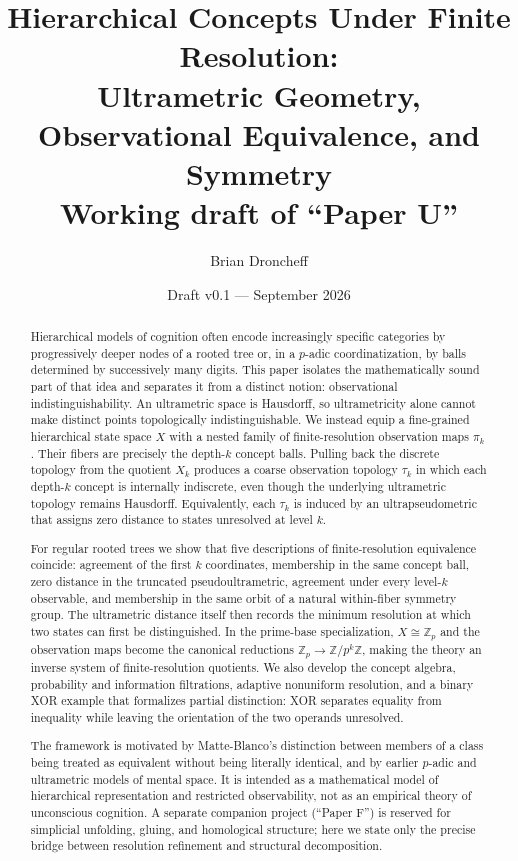 \documentclass[11pt]{article}
\title{Hierarchical Concepts Under Finite Resolution:\\
Ultrametric Geometry, Observational Equivalence, and Symmetry\\
\large Working draft of ``Paper U''}
\author{Brian Droncheff}
\date{Draft v0.1 --- September 2026}
\theoremstyle{definition}
\theoremstyle{remark}
\begin{document}
\maketitle

\begin{abstract}
Hierarchical models of cognition often encode increasingly specific categories by progressively deeper nodes of a rooted tree or, in a $p$-adic coordinatization, by balls determined by successively many digits.  This paper isolates the mathematically sound part of that idea and separates it from a distinct notion: observational indistinguishability.  An ultrametric space is Hausdorff, so ultrametricity alone cannot make distinct points topologically indistinguishable.  We instead equip a fine-grained hierarchical state space $X$ with a nested family of finite-resolution observation maps $\pi_k$.  Their fibers are precisely the depth-$k$ concept balls.  Pulling back the discrete topology from the quotient $X_k$ produces a coarse observation topology $\tau_k$ in which each depth-$k$ concept is internally indiscrete, even though the underlying ultrametric topology remains Hausdorff.  Equivalently, each $\tau_k$ is induced by an ultrapseudometric that assigns zero distance to states unresolved at level $k$.

For regular rooted trees we show that five descriptions of finite-resolution equivalence coincide: agreement of the first $k$ coordinates, membership in the same concept ball, zero distance in the truncated pseudoultrametric, agreement under every level-$k$ observable, and membership in the same orbit of a natural within-fiber symmetry group.  The ultrametric distance itself then records the minimum resolution at which two states can first be distinguished.  In the prime-base specialization, $X\cong\mathbb Z_p$ and the observation maps become the canonical reductions $\mathbb Z_p\to\mathbb Z/p^k\mathbb Z$, making the theory an inverse system of finite-resolution quotients.  We also develop the concept algebra, probability and information filtrations, adaptive nonuniform resolution, and a binary XOR example that formalizes partial distinction: XOR separates equality from inequality while leaving the orientation of the two operands unresolved.

The framework is motivated by Matte-Blanco's distinction between members of a class being treated as equivalent without being literally identical, and by earlier $p$-adic and ultrametric models of mental space.  It is intended as a mathematical model of hierarchical representation and restricted observability, not as an empirical theory of unconscious cognition.  A separate companion project (``Paper F'') is reserved for simplicial unfolding, gluing, and homological structure; here we state only the precise bridge between resolution refinement and structural decomposition.
\end{abstract}
\end{document}
